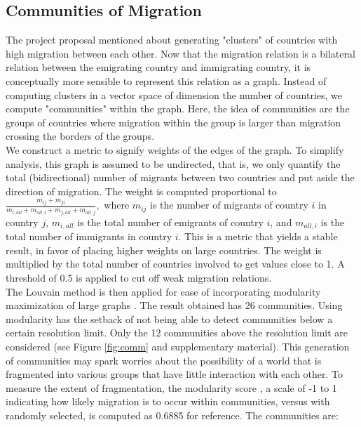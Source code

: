 \documentclass{acm_proc_article-sp}
\begin{document}
\subsection{Communities of Migration}
The project proposal mentioned about generating "clusters" of countries with high migration between each other. Now that the migration relation is a bilateral relation between the emigrating country and immigrating country, it is conceptually more sensible to represent this relation as a graph. Instead of computing clusters in a vector space of dimension the number of countries, we compute "communities" within the graph. Here, the idea of communities are the groups of countries where migration within the group is larger than migration crossing the borders of the groups.
\\
We construct a metric to signify weights of the edges of the graph. To simplify analysis, this graph is assumed to be undirected, that is, we only quantify the total (bidirectional) number of migrants between two countries and put aside the direction of migration. The weight is computed proportional to 
$\frac{m_{ij}+m_{ji}}{m_{i,all}+m_{all,i}+m_{j,all}+m_{all,j}}, $
where $m_{ij}$ is the number of migrants of country $i$ in country $j$,  $m_{i,all}$ is the total number of emigrants of country $i$,
and $m_{all,i}$ is the total number of immigrants in country $i$. This is a metric that yields a stable result, in favor of placing higher weights on large countries. The weight is multiplied by the total number of countries involved to get values close to 1. A threshold of 0.5 is applied to cut off weak migration relations. 
\\
The Louvain method is then applied for ease of incorporating modularity maximization of large graphs \cite{louvain}. The result obtained has 26 communities. Using modularity has the setback of not being able to detect communities below a certain resolution limit. Only the 12 communities above the resolution limit are considered (see Figure \ref{fig:comm} and supplementary material). This generation of communities may spark worries about the possibility of a world that is fragmented into various groups that have little interaction with each other. To measure the extent of fragmentation, the modularity score \cite{newman06}, a scale of -1 to 1 indicating how likely migration is to occur within communities, versus with randomly selected, is computed as 0.6885 for reference. The communities are:
\end{document}
